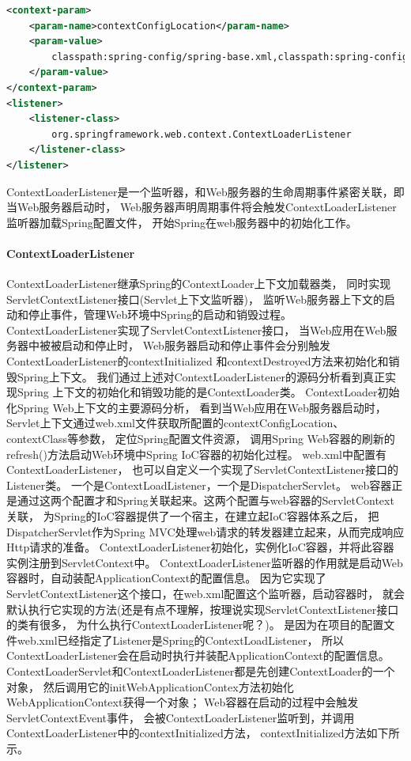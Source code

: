 \documentclass{book}
\begin{document}
\begin{lstlisting}[language=XML]
<context-param>
	<param-name>contextConfigLocation</param-name>
	<param-value>
		classpath:spring-config/spring-base.xml,classpath:spring-config/spring-ldap.xml
	</param-value>
</context-param>
<listener>
	<listener-class>
		org.springframework.web.context.ContextLoaderListener
	</listener-class>
</listener>
\end{lstlisting}

ContextLoaderListener是一个监听器，和Web服务器的生命周期事件紧密关联，即当Web服务器启动时，
Web服务器声明周期事件将会触发ContextLoaderListener监听器加载Spring配置文件，
开始Spring在web服务器中的初始化工作。

\paragraph{ContextLoaderListener}

ContextLoaderListener继承Spring的ContextLoader上下文加载器类，
同时实现ServletContextListener接口(Servlet上下文监听器)，
监听Web服务器上下文的启动和停止事件，管理Web环境中Spring的启动和销毁过程。
ContextLoaderListener实现了ServletContextListener接口，
当Web应用在Web服务器中被被启动和停止时，
Web服务器启动和停止事件会分别触发ContextLoaderListener的contextInitialized
和contextDestroyed方法来初始化和销毁Spring上下文。
我们通过上述对ContextLoaderListener的源码分析看到真正实现Spring
上下文的初始化和销毁功能的是ContextLoader类。
ContextLoader初始化Spring Web上下文的主要源码分析，
看到当Web应用在Web服务器启动时，
Servlet上下文通过web.xml文件获取所配置的contextConfigLocation、contextClass等参数，
定位Spring配置文件资源，
调用Spring Web容器的刷新的refresh()方法启动Web环境中Spring IoC容器的初始化过程。
web.xml中配置有ContextLoaderListener，
也可以自定义一个实现了ServletContextListener接口的Listener类。
一个是ContextLoadListener，一个是DispatcherServlet。
web容器正是通过这两个配置才和Spring关联起来。这两个配置与web容器的ServletContext关联，
为Spring的IoC容器提供了一个宿主，在建立起IoC容器体系之后，
把DispatcherServlet作为Spring MVC处理web请求的转发器建立起来，从而完成响应Http请求的准备。
ContextLoaderListener初始化，实例化IoC容器，并将此容器实例注册到ServletContext中。
ContextLoaderListener监听器的作用就是启动Web容器时，自动装配ApplicationContext的配置信息。
因为它实现了ServletContextListener这个接口，在web.xml配置这个监听器，启动容器时，
就会默认执行它实现的方法(还是有点不理解，按理说实现ServletContextListener接口的类有很多，
为什么执行ContextLoaderListener呢？)。
是因为在项目的配置文件web.xml已经指定了Listener是Spring的ContextLoadListener，
所以ContextLoaderListener会在启动时执行并装配ApplicationContext的配置信息。
ContextLoaderServlet和ContextLoaderListener都是先创建ContextLoader的一个对象，
然后调用它的initWebApplicationContex方法初始化WebApplicationContext获得一个对象；
Web容器在启动的过程中会触发ServletContextEvent事件，
会被ContextLoaderListener监听到，并调用ContextLoaderListener中的contextInitialized方法，
contextInitialized方法如下所示。
\end{document}
